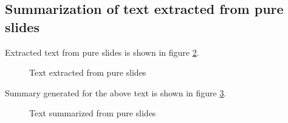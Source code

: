 \subsection{Summarization of text extracted from pure slides}
Extracted text from pure slides is shown in figure \ref{fig:orig_text2}.
\begin{figure}[H]
\centering
	\label{fig:orig_text1}
\end{figure}
\begin{figure}[H]
\centering
	\caption{Text extracted from pure slides}
	\label{fig:orig_text2}
\end{figure}
\newpage
Summary generated for the above text is shown in figure \ref{fig:orig_sum1}.
\begin{figure}[H]
\centering
	\caption{Text summarized from pure slides}
	\label{fig:orig_sum1}
\end{figure}

